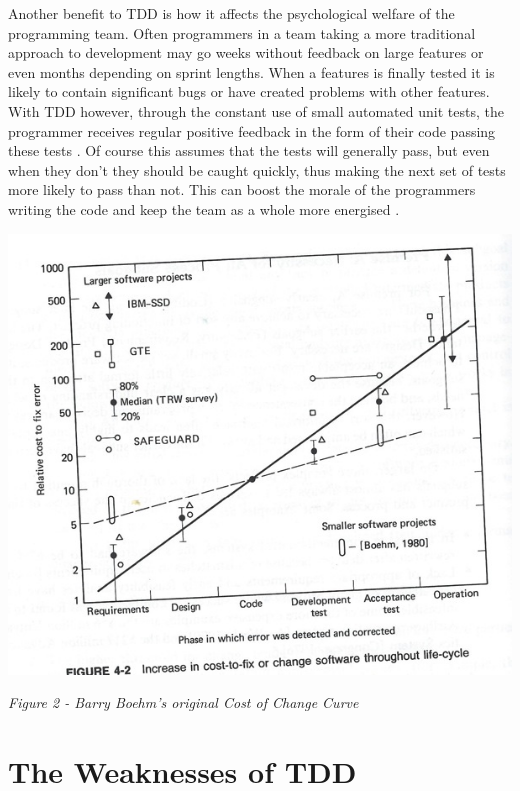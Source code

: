 \documentclass{scrartcl}
\begin{document}
Another benefit to TDD is how it affects the psychological welfare of the programming team. Often programmers in a team taking a more traditional approach to development may go weeks without feedback on large features or even months depending on sprint lengths. When a features is finally tested it is  likely to contain significant bugs or have created problems with other features. With TDD however,  through the constant use of small automated unit tests, the programmer receives regular positive feedback in the form of their code passing these tests \cite{GamaEmbracingFun}. Of course this assumes that the tests will generally pass, but even when they don't they should be caught quickly, thus making the next set of tests more likely to pass than not. This can boost the morale of the programmers writing the code and keep the team as a whole more energised \cite{GDCBackwards}.




\begin{center}
\includegraphics[scale=0.4]{costofchange.png}
\end{center}

\begin{center}
\textit{Figure 2 - Barry Boehm's original Cost of Change Curve }
\end{center}

\section{The Weaknesses of TDD}
\end{document}
